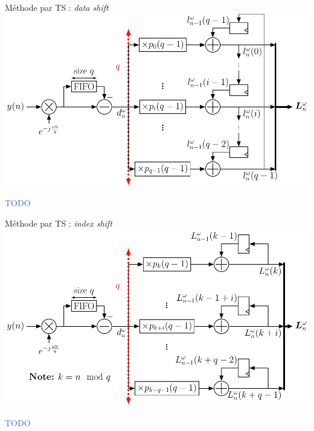 \documentclass[../main.tex]{subfiles}
\begin{document}
\begin{frame}{Méthode par TS : \textit{data shift}}
  \centering
  \includegraphics[width=\linewidth, height=.7\textheight, keepaspectratio=true]{figures/tikzpicture/arch_statts_sync_stdl.pdf}
  \begin{center}
    \textcolor{RoyalBlue}{TODO}
  \end{center}
\end{frame}

\begin{frame}{Méthode par TS : \textit{index shift}}
  \centering
  \includegraphics[width=\linewidth, height=.71\textheight, keepaspectratio=true]{figures/tikzpicture/arch_subts_sync_stdl.pdf}
  \begin{center}
    \textcolor{RoyalBlue}{TODO}
  \end{center}
\end{frame}
\end{document}
